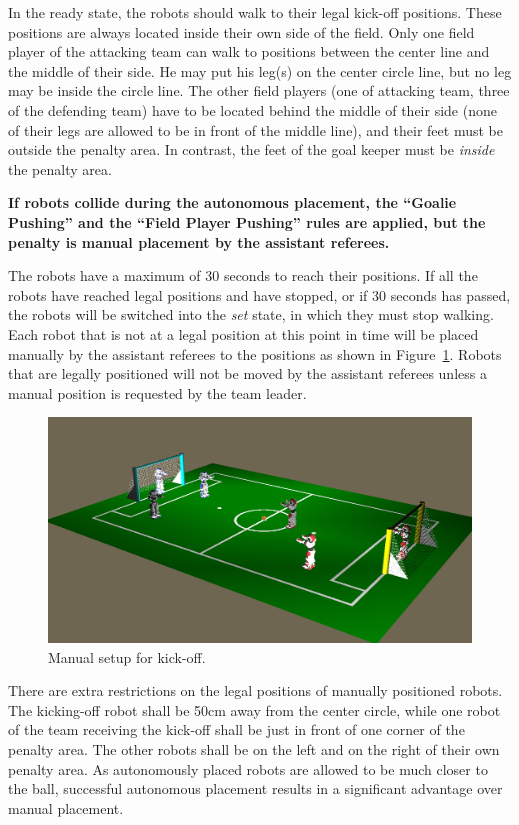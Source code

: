 \documentclass[12pt]{article}
\begin{document}
In the ready state, the robots should walk
to their legal kick-off positions. These positions are always
located inside their own side of the field. Only one field player
of the attacking team can walk to positions between the center line
and the middle of their side. He may put his leg(s) on the
center circle line, but no leg may be inside the circle line. The
other field players (one of attacking team, three of the defending team)
have to be located behind the middle of their side (none of their
legs are allowed to be in front of the middle line), and their feet must be outside the penalty area.
In contrast, the feet of the goal keeper must be \emph{inside}
the penalty area.

\textbf{If robots collide during the autonomous placement, the ``Goalie
Pushing'' and the ``Field Player Pushing'' rules are applied, but
the penalty is manual placement by the assistant referees.}

The robots have a maximum of 30 seconds to reach their positions.
If all the robots have reached legal positions and have stopped, or
if 30 seconds has passed, the robots will be switched into the
\emph{set} state, in which they
must stop walking. Each robot that is not at a legal position at
this point in time will be placed manually by the assistant referees
to the positions as shown in Figure~\ref{fig:ko}. Robots
that are legally positioned will not be moved by the assistant
referees unless a manual position is requested by the team leader.

\begin{figure}[t]
\centerline{\includegraphics[width=\columnwidth]{figs/Kickoff3vs3}}
\caption{Manual setup for kick-off.}
\label{fig:ko}
\end{figure}

There are extra restrictions on the legal positions of manually
positioned robots. The kicking-off robot shall be 50cm
away from the center circle, while one robot of the team receiving the kick-off shall
be just in front of one corner of the penalty area. The other robots
shall be on the left and on the right of their own penalty area. As
autonomously placed robots are allowed to be much closer to the
ball, successful autonomous placement results in a significant
advantage over manual placement.
\end{document}
